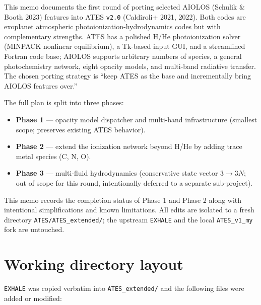 \documentclass[english,a4paper]{my_memo}
\begin{document}
This memo documents the first round of porting selected AIOLOS (Schulik \& Booth 2023)
features into ATES \texttt{v2.0} (Caldiroli+ 2021, 2022). Both codes are exoplanet
atmospheric photoionization-hydrodynamics codes but with complementary strengths.
ATES has a polished H/He photoionization solver (MINPACK nonlinear equilibrium),
a Tk-based input GUI, and a streamlined Fortran code base; AIOLOS supports
arbitrary numbers of species, a general photochemistry network, eight opacity
models, and multi-band radiative transfer. The chosen porting strategy is
``keep ATES as the base and incrementally bring AIOLOS features over.''

The full plan is split into three phases:
\begin{itemize}
\item \textbf{Phase 1} --- opacity model dispatcher and multi-band infrastructure
(smallest scope; preserves existing ATES behavior).
\item \textbf{Phase 2} --- extend the ionization network beyond H/He by adding
trace metal species (C, N, O).
\item \textbf{Phase 3} --- multi-fluid hydrodynamics (conservative state vector
$3 \to 3N$; out of scope for this round, intentionally deferred to a separate
sub-project).
\end{itemize}

This memo records the completion status of Phase 1 and Phase 2 along with
intentional simplifications and known limitations. All edits are isolated to a
fresh directory \texttt{ATES/ATES\_extended/}; the upstream
\texttt{EXHALE} and the local \texttt{ATES\_v1\_my} fork are untouched.

\section{Working directory layout}

\texttt{EXHALE} was copied verbatim into \texttt{ATES\_extended/} and
the following files were added or modified:
\end{document}
